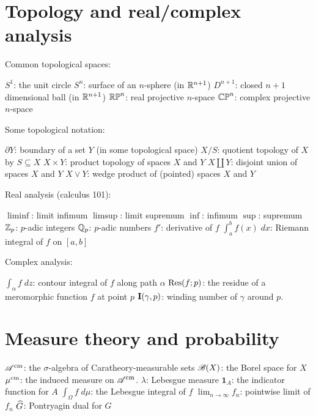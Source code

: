 \section{Topology and real/complex analysis}
Common topological spaces:
\begin{itemize}
	\ii $S^1$: the unit circle
	\ii $S^n$: surface of an $n$-sphere (in $\mathbb R^{n+1}$)
	\ii $D^{n+1}$: closed $n+1$ dimensional ball (in $\mathbb R^{n+1}$)
	\ii $\mathbb{RP}^n$: real projective $n$-space
	\ii $\mathbb{CP}^n$: complex projective $n$-space
\end{itemize}
Some topological notation:
\begin{itemize}
	\ii $\partial Y$: boundary of a set $Y$ (in some topological space)
	\ii $X/S$: quotient topology of $X$ by $S \subseteq X$
	\ii $X \times Y$: product topology of spaces $X$ and $Y$
	\ii $X \amalg Y$: disjoint union of spaces $X$ and $Y$
	\ii $X \vee Y$: wedge product of (pointed) spaces $X$ and $Y$
\end{itemize}
Real analysis (calculus 101):
\begin{itemize}
	\ii $\liminf$: limit infimum
	\ii $\limsup$: limit supremum
	\ii $\inf$: infimum
	\ii $\sup$: supremum
	\ii $\mathbb Z_p$: $p$-adic integers
	\ii $\mathbb Q_p$: $p$-adic numbers
	\ii $f'$: derivative of $f$
	\ii $\int_a^b f(x) \; dx$: Riemann integral of $f$ on $[a,b]$
\end{itemize}
Complex analysis:
\begin{itemize}
	\ii $\int_\alpha f \; dz$: contour integral of $f$ along path $\alpha$
	\ii $\operatorname{Res}(f;p)$: the residue of a meromorphic function $f$ at point $p$
	\ii $\operatorname{\mathbf I}(\gamma, p)$: winding number of $\gamma$ around $p$.
\end{itemize}
\section{Measure theory and probability}
\begin{itemize}
	\ii $\mathscr A^\text{cm}$: the $\sigma$-algebra of Caratheory-measurable sets
	\ii $\mathscr B(X)$: the Borel space for $X$
	\ii $\mu^\text{cm}$: the induced measure on $\mathscr A^\text{cm}$.
	\ii $\lambda$: Lebesgue measure
	\ii $\mathbf{1}_A$: the indicator function for $A$
	\ii $\int_\Omega f \; d\mu$: the Lebesgue integral of $f$
	\ii $\lim_{n \to \infty} f_n$: pointwise limit of $f_n$
	\ii $\widehat G$: Pontryagin dual for $G$
\end{itemize}

